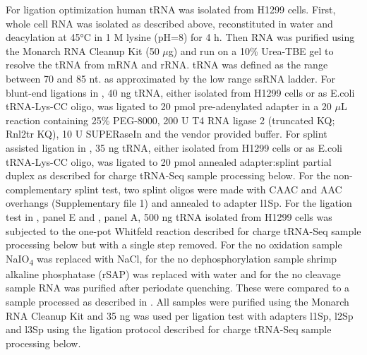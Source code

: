 \documentclass[9pt,lineno]{elife}
\begin{document}
For ligation optimization human tRNA was isolated from H1299 cells.
First, whole cell RNA was isolated as described above, reconstituted in water and deacylation at 45°C in 1 M lysine (pH=8) for 4 h.
Then RNA was purified using the Monarch RNA Cleanup Kit (50 $\mu$g) and run on a 10\% Urea-TBE gel to resolve the tRNA from mRNA and rRNA.
tRNA was defined as the range between 70 and 85 nt. as approximated by the low range ssRNA ladder.
For blunt-end ligations in , 40 ng tRNA, either isolated from H1299 cells or as E.coli tRNA-Lys-CC oligo, was ligated to 20 pmol pre-adenylated adapter in a 20 $\mu$L reaction containing 25\% PEG-8000, 200 U T4 RNA ligase 2 (truncated KQ; Rnl2tr KQ), 10 U SUPERaseIn and the vendor provided buffer.
For splint assisted ligation in , 35 ng tRNA, either isolated from H1299 cells or as E.coli tRNA-Lys-CC oligo, was ligated to 20 pmol annealed adapter:splint partial duplex as described for charge tRNA-Seq sample processing below.
For the non-complementary splint test, two splint oligos were made with CAAC and AAC overhangs (Supplementary file 1) and annealed to adapter l1Sp.
For the ligation test in , panel E and , panel A, 500 ng tRNA isolated from H1299 cells was subjected to the one-pot Whitfeld reaction described for charge tRNA-Seq sample processing below but with a single step removed.
For the no oxidation sample NaIO\textsubscript{4} was replaced with NaCl, for the no dephosphorylation sample shrimp alkaline phosphatase (rSAP) was replaced with water and for the no cleavage sample RNA was purified after periodate quenching.
These were compared to a sample processed as described in \cite{Evans2017-st}.
All samples were purified using the Monarch RNA Cleanup Kit and 35 ng was used per ligation test with adapters l1Sp, l2Sp and l3Sp using the ligation protocol described for charge tRNA-Seq sample processing below.
\end{document}
